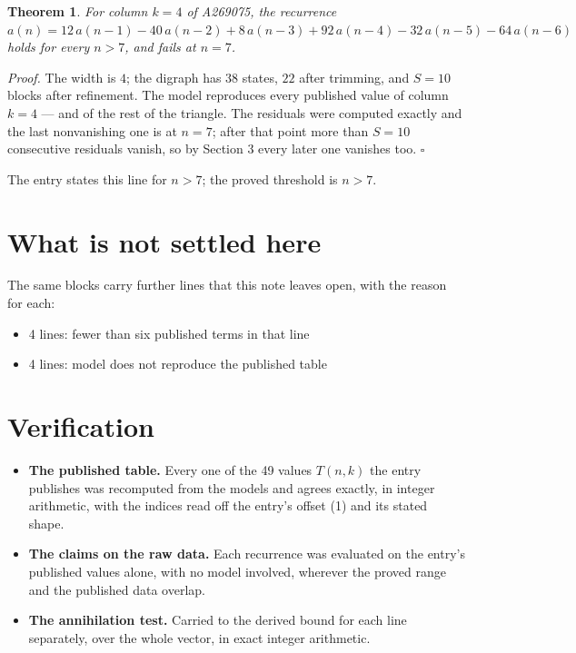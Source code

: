 \documentclass[11pt]{article}
\newtheorem{theorem}{Theorem}
\theoremstyle{definition}
\begin{document}
\begin{theorem} For column $k = 4$ of A269075, the recurrence $a(n) = 12\,a(n-1) - 40\,a(n-2) + 8\,a(n-3) + 92\,a(n-4) - 32\,a(n-5) - 64\,a(n-6)$ holds for every $n > 7$, and fails at $n = 7$.\end{theorem}

{\itshape Proof.} The width is $4$; the digraph has $38$ states, $22$ after trimming, and $S = 10$ blocks after refinement. The model reproduces every published value of column $k = 4$ --- and of the rest of the triangle. The residuals were computed exactly and the last nonvanishing one is at $n = 7$; after that point more than $S = 10$ consecutive residuals vanish, so by Section 3 every later one vanishes too. $\square$

The entry states this line for $n > 7$; the proved threshold is $n > 7$.

\section{What is not settled here}

The same blocks carry further lines that this note leaves open, with the reason for each:

\begin{itemize}

\item 4 lines: fewer than six published terms in that line

\item 4 lines: model does not reproduce the published table

\end{itemize}

\section{Verification}

\begin{itemize}

\item {\bfseries The published table.} Every one of the 49 values $T(n,k)$ the entry publishes was recomputed from the models and agrees exactly, in integer arithmetic, with the indices read off the entry's offset (1) and its stated shape.

\item {\bfseries The claims on the raw data.} Each recurrence was evaluated on the entry's published values alone, with no model involved, wherever the proved range and the published data overlap.

\item {\bfseries The annihilation test.} Carried to the derived bound for each line separately, over the whole vector, in exact integer arithmetic.

\end{itemize}
\end{document}

